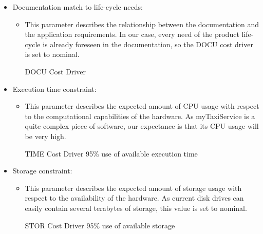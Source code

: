 \begin{itemize}
	\item Documentation match to life-cycle needs: 
	\begin{itemize}
	\item[] This parameter describes the relationship between the  documentation and the application requirements. In our case, every need of the product life-cycle is already foreseen in the documentation, so the DOCU cost driver is set to nominal.
	\begin{costdriverstable}{DOCU Cost Driver}
		\hline
	\end{costdriverstable}
	\end{itemize}
\end{itemize}

\begin{itemize}
	\item Execution time constraint: 
	\begin{itemize}
	\item[] This parameter describes the expected amount of CPU usage with respect to the computational capabilities of the hardware. As myTaxiService is a quite complex piece of software, our expectance is that its CPU usage will be very high.
	\begin{costdriverstable}{TIME Cost Driver}
		 {95\% use of available execution time}\hline
	\end{costdriverstable}
	\end{itemize}
\end{itemize}

\begin{itemize}
	\item Storage constraint: 
	\begin{itemize}
	\item[] This parameter describes the expected amount of storage usage with respect to the availability of the hardware. As current disk drives can easily contain several terabytes of storage, this value is set to nominal.
	\begin{costdriverstable}{STOR Cost Driver}
		 {95\% use of available storage}\hline
	\end{costdriverstable}
	\end{itemize}
\end{itemize}

